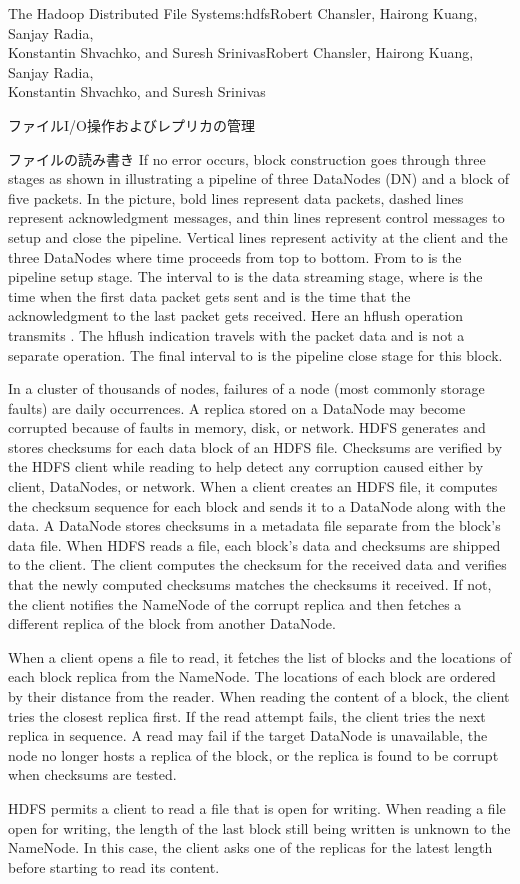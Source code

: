 \begin{aosachaptertoc}{The Hadoop Distributed File System}{s:hdfs}{Robert Chansler, Hairong Kuang, Sanjay Radia, \\ Konstantin Shvachko, and Suresh Srinivas}{Robert Chansler, Hairong Kuang, Sanjay Radia, \\ \hspace*{0.9cm} Konstantin Shvachko, and Suresh Srinivas}
\begin{aosasect1}{ファイルI/O操作およびレプリカの管理}
\begin{aosasect2}{ファイルの読み書き}
If no error occurs, block construction goes through three stages as
shown in  illustrating a pipeline of three
DataNodes (DN) and a block of five packets.  In the picture, bold
lines represent data packets, dashed lines represent acknowledgment
messages, and thin lines represent control messages to setup and close
the pipeline. Vertical lines represent activity at the client and the
three DataNodes where time proceeds from top to bottom.  From
 to  is the pipeline setup stage. The interval
 to  is the data streaming stage, where  is
the time when the first data packet gets sent and  is the
time that the acknowledgment to the last packet gets received. Here an
hflush operation transmits .  The hflush indication
travels with the packet data and is not a separate operation. The
final interval  to  is the pipeline close stage for
this block.

In a cluster of thousands of nodes, failures of a node (most commonly
storage faults) are daily occurrences. A replica stored on a DataNode
may become corrupted because of faults in memory, disk, or network.
HDFS generates and stores checksums for each data block of an HDFS
file. Checksums are verified by the HDFS client while reading to help
detect any corruption caused either by client, DataNodes, or
network. When a client creates an HDFS file, it computes the checksum
sequence for each block and sends it to a DataNode along with the
data. A DataNode stores checksums in a metadata file separate from the
block's data file. When HDFS reads a file, each block's data and
checksums are shipped to the client. The client computes the checksum
for the received data and verifies that the newly computed checksums
matches the checksums it received. If not, the client notifies the
NameNode of the corrupt replica and then fetches a different replica
of the block from another DataNode.

When a client opens a file to read, it fetches the list of blocks and
the locations of each block replica from the NameNode. The locations
of each block are ordered by their distance from the reader. When
reading the content of a block, the client tries the closest replica
first. If the read attempt fails, the client tries the next replica in
sequence. A read may fail if the target DataNode is unavailable, the
node no longer hosts a replica of the block, or the replica is found
to be corrupt when checksums are tested.

HDFS permits a client to read a file that is open for writing. When
reading a file open for writing, the length of the last block still
being written is unknown to the NameNode. In this case, the client
asks one of the replicas for the latest length before starting to read
its content.


\end{aosasect2}
\end{aosasect1}
\end{aosachaptertoc}
